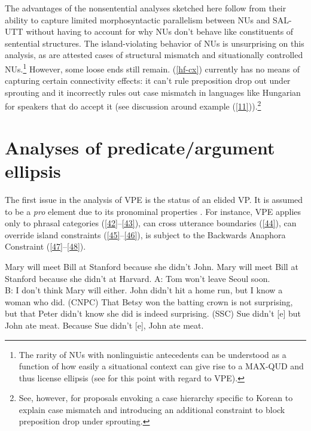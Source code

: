 \documentclass[output=paper
                ,modfonts
                ,nonflat
	        ,collection
	        ,collectionchapter
	        ,collectiontoclongg
 	        ,biblatex
                ,babelshorthands
                ,newtxmath
                ,draftmode
                ,colorlinks, citecolor=brown
]{./langsci/langscibook}
\begin{document}
{The advantages of the nonsentential analyses sketched here follow from their ability to capture limited morphosyntactic parallelism between NUs and SAL-UTT without having to account for why NUs don't behave like constituents of sentential structures. The island-violating behavior of NUs is unsurprising on this analysis, as are attested cases of structural mismatch and situationally controlled NUs.\footnote{The rarity of NUs with nonlinguistic antecedents can be understood as a function of how easily a situational context can give rise to a MAX-QUD and thus license ellipsis (see \citealt{Miller2014b} for this point with regard to VPE).} However, some loose ends still remain. (\ref{hf-cx}) currently has no means of capturing certain connectivity effects: it can't rule preposition drop out under sprouting and it incorrectly rules out case mismatch in languages like Hungarian for speakers that do accept it (see discussion around example (\ref{11})).\footnote{See, however, \citet{Kim2015} for proposals envoking a case hierarchy specific to Korean to explain case mismatch and introducing an additional constraint to block preposition drop under sprouting.}


\section{Analyses of predicate/argument ellipsis}
The first issue in the analysis of VPE is the status of an elided VP. It is assumed to be a \emph{pro} element due to its pronominal properties \citep[see][]{Lobeck1995, Lopez2000, Kim2006, Aelbrecht2015, Ginzburg2018}. For instance, VPE applies only to phrasal categories (\ref{42}--\ref{43}),
can cross utterance boundaries (\ref{44}), can override island constraints (\ref{45}--\ref{46}), is subject to the Backwards Anaphora Constraint (\ref{47}--\ref{48}).

\ea *Mary will meet Bill at Stanford because she didn't  \jbtr John.\label{42}\z
\ea Mary will meet Bill at Stanford because she didn't \jbtr at Harvard.\label{43}\z
\ea A: Tom won't leave Seoul soon.\\
B: I don't think Mary will \jbtr either.\label{44}\z
\ea John didn't hit a home run, but I know a woman who did. (CNPC)\label{45}\z
\ea That Betsy won the batting crown is not surprising, but that
Peter didn't know she did \jbtr is indeed surprising. (SSC)\label{46}\z
\ea *Sue didn't [e] but John ate meat.\label{47}\z
\ea Because Sue didn't [e], John ate meat.\label{48}\z

%

}
\end{document}
